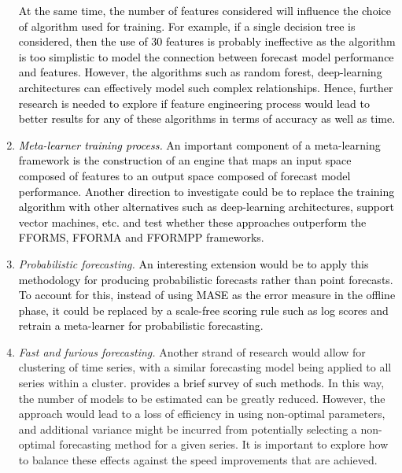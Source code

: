 \documentclass{monashthesis}
\begin{document}
\begin{enumerate}
  \textcolor{black}{At the same time, the number of features considered will influence the choice of algorithm used for training. For example, if a single decision tree is considered, then the use of 30 features is probably ineffective as the algorithm is too simplistic to model the connection between forecast model performance and features.  However, the algorithms such as random forest, deep-learning architectures can effectively model such complex relationships. Hence, further research is needed to explore if feature engineering process would lead to better results for any of these algorithms in terms of accuracy as well as time.}
\item
  \textcolor{black}{\textit{Meta-learner training process.} An important component of a meta-learning framework is the construction of an engine that maps an input space composed of features to an output space composed of forecast model performance. Another direction to investigate could be to replace the training algorithm with other alternatives such as deep-learning architectures, support vector machines, etc. and test whether these approaches outperform the FFORMS, FFORMA and FFORMPP frameworks.}
\item
  \emph{Probabilistic forecasting.} \textcolor{black}{An interesting extension would be to apply this methodology for producing probabilistic forecasts rather than point forecasts. To account for this, instead of using MASE as the error measure in the offline phase, it could be replaced by a scale-free scoring rule such as log scores and retrain a meta-learner for probabilistic forecasting.}
\item
  \emph{Fast and furious forecasting.} Another strand of research would allow for clustering of time series, with a similar forecasting model being applied to all series within a cluster. \textcite{ashouri2019tree} \textcolor{black}{provides a brief survey of such methods.} In this way, the number of models to be estimated can be greatly reduced. However, the approach would lead to a loss of efficiency in using non-optimal parameters, and additional variance might be incurred from potentially selecting a non-optimal forecasting method for a given series. It is important to explore how to balance these effects against the speed improvements that are achieved.
\end{enumerate}

\printbibliography[heading=bibintoc]
\end{document}
